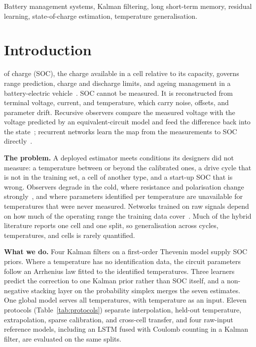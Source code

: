 \documentclass[journal]{IEEEtran}
\begin{document}
\begin{IEEEkeywords}
Battery management systems, Kalman filtering, long short-term memory, residual learning, state-of-charge estimation, temperature generalisation.
\end{IEEEkeywords}

\section{Introduction}
 of charge (SOC), the charge available in a cell relative to its capacity, governs range prediction, charge and discharge limits, and ageing management in a battery-electric vehicle~\cite{xiong2018review,plett2015bms}. SOC cannot be measured. It is reconstructed from terminal voltage, current, and temperature, which carry noise, offsets, and parameter drift. Recursive observers compare the measured voltage with the voltage predicted by an equivalent-circuit model and feed the difference back into the state~\cite{plett2004ekf,chen2013ekf}; recurrent networks learn the map from the measurements to SOC directly~\cite{chemali2017lstm}.

\textbf{The problem.} A deployed estimator meets conditions its designers did not measure: a temperature between or beyond the calibrated ones, a drive cycle that is not in the training set, a cell of another type, and a start-up SOC that is wrong. Observers degrade in the cold, where resistance and polarisation change strongly~\cite{xiong2018review,hannan2017review}, and where parameters identified per temperature are unavailable for temperatures that were never measured. Networks trained on raw signals depend on how much of the operating range the training data cover~\cite{zhao2024wevj,hu2026ionics}. Much of the hybrid literature reports one cell and one split, so generalisation across cycles, temperatures, and cells is rarely quantified.

\textbf{What we do.} Four Kalman filters on a first-order Thevenin model supply SOC priors. Where a temperature has no identification data, the circuit parameters follow an Arrhenius law fitted to the identified temperatures. Three learners predict the correction to one Kalman prior rather than SOC itself, and a non-negative stacking layer on the probability simplex merges the seven estimates. One global model serves all temperatures, with temperature as an input. Eleven protocols (Table~\ref{tab:protocols}) separate interpolation, held-out temperature, extrapolation, sparse calibration, and cross-cell transfer, and four raw-input reference models, including an LSTM fused with Coulomb counting in a Kalman filter, are evaluated on the same splits.
\end{document}
